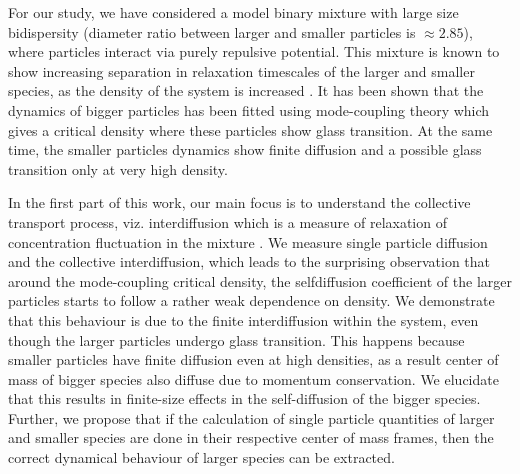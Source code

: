For our study, we have considered a model binary mixture with large size bidispersity (diameter ratio between larger and smaller particles is $\approx 2.85$), where particles interact via purely repulsive potential. This mixture is known to show increasing separation in relaxation timescales of the larger and smaller species, as the density of the system is increased \cite{voigtmann2009double}. It has been shown that the dynamics of bigger particles has been fitted using mode-coupling theory which gives a critical density where these particles show glass transition. At the same time, the smaller particles dynamics show finite diffusion and a possible glass transition only at very high density.

 In the first part of this work, our main focus is to understand the collective transport process, viz. interdiffusion which is a measure of relaxation of concentration fluctuation in the mixture \cite{vaibhav2022finite}. We measure single particle diffusion and the collective interdiffusion, which leads to the surprising observation that around the mode-coupling critical density, the selfdiffusion coefficient of the larger particles starts to follow a rather weak dependence on density. We demonstrate that this behaviour is due to the finite interdiffusion within the system, even though the larger particles undergo glass transition. This happens because smaller particles have finite diffusion even at high densities, as a result center of mass of bigger species also diffuse due to momentum conservation. We elucidate that this results in finite-size effects in the self-diffusion of the bigger species. Further, we propose that if the calculation of single particle quantities of larger and smaller species are done in their respective center of mass frames, then the correct dynamical behaviour of larger species can be extracted.

